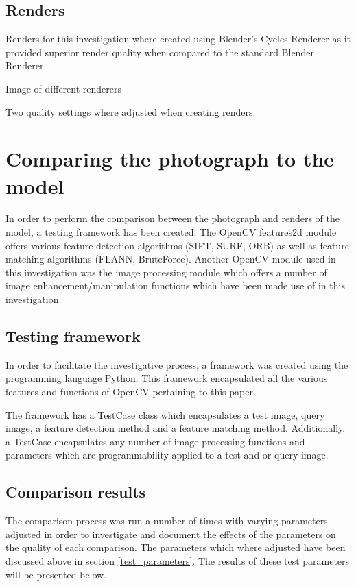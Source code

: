 \documentclass[11pt,a4paper]{report}
\begin{document}
		\subsection{Renders}
			Renders for this investigation where created using Blender's Cycles Renderer as it provided superior render quality when compared to the standard Blender Renderer.
			
			{{Image of different renderers}}
			
			Two quality settings where adjusted when creating renders.

	\section{Comparing the photograph to the model}
		In order to perform the comparison between the photograph and renders of the model, a testing framework has been created.
		The OpenCV features2d module offers various feature detection algorithms (SIFT, SURF, ORB) as well as feature matching algorithms (FLANN, BruteForce). Another OpenCV module used in this investigation was the image processing module which offers a number of image enhancement/manipulation functions which have been made use of in this investigation.
		
		\subsection{Testing framework}
			In order to facilitate the investigative process, a framework was created using the programming language Python. This framework encapsulated all the various features and functions of OpenCV pertaining to this paper.
			
			The framework has a TestCase class which encapsulates a test image, query image, a feature detection method and a feature matching method. Additionally, a TestCase encapsulates any number of image processing functions and parameters which are programmability applied to a test and or query image.
			
		\subsection{Comparison results}
			The comparison process was run a number of times with varying parameters adjusted in order to investigate and document the effects of the parameters on the quality of each comparison. The parameters which where adjusted have been discussed above in section \ref{test_parameters}. The results of these test parameters will be presented below.
			
\end{document}
